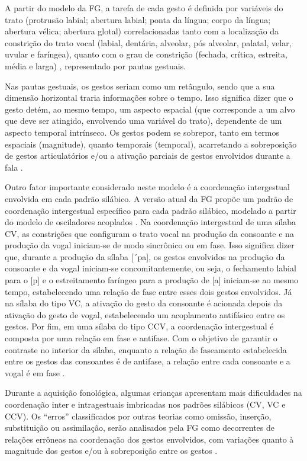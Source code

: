 \documentclass[output=paper,colorlinks,citecolor=brown,booklanguage=portuguese]{langscibook}
\begin{document}
A partir do modelo da FG, a tarefa de cada gesto é definida por variáveis do trato (protrusão labial; abertura labial; ponta da língua; corpo da língua; abertura vélica; abertura glotal) correlacionadas tanto com a localização da constrição do trato vocal (labial, dentária, alveolar, pós alveolar, palatal, velar, uvular e faríngea), quanto com o grau de constrição (fechada, crítica, estreita, média e larga) \citep{Browman1992, Albano2001}, representado por pautas gestuais. 

Nas pautas gestuais, os gestos seriam como um retângulo, sendo que a sua dimensão horizontal traria informações sobre o tempo. Isso significa dizer que o gesto detém, ao mesmo tempo, um aspecto espacial (que corresponde a um alvo que deve ser atingido, envolvendo uma variável do trato), dependente de um aspecto temporal intrínseco. Os gestos podem se sobrepor, tanto em termos espaciais (magnitude), quanto temporais (temporal), acarretando a sobreposição de gestos articulatórios e/ou a ativação parciais de gestos envolvidos durante a fala \citep{Pouplier2005}.

Outro fator importante considerado neste modelo é a coordenação intergestual envolvida em cada padrão silábico. A versão atual da FG propõe um padrão de coordenação intergestual específico para cada padrão silábico, modelado a partir do modelo de osciladores acoplados \citep{Goldstein2007}. Na coordenação intergestual de uma sílaba CV, as constrições que configuram o trato vocal na produção da consoante e na produção da vogal iniciam-se de modo sincrônico ou em fase. Isso significa dizer que, durante a produção da sílaba [´pa], os gestos envolvidos na produção da consoante e da vogal iniciam-se concomitantemente, ou seja, o fechamento labial para o [p] e o estreitamento faríngeo para a produção de [a] iniciam-se ao mesmo tempo, estabelecendo uma relação de fase entre esses dois gestos envolvidos. Já na sílaba do tipo VC, a ativação do gesto da consoante é acionada depois da ativação do gesto de vogal, estabelecendo um acoplamento antifásico entre os gestos. Por fim, em uma sílaba do tipo CCV, a coordenação intergestual é composta por uma relação em fase e antifase.  Com o objetivo de garantir o contraste no interior da sílaba, enquanto a relação de faseamento estabelecida entre os gestos das consoantes é de antifase, a relação entre cada consoante e a vogal é em fase \citep{Browman2000, Marin2010}. 

Durante a aquisição fonológica, algumas crianças apresentam mais dificuldades na coordenação inter e intragestuais imbricadas nos padrões silábicos (CV, VC e CCV). Os “erros” classificados por outras teorias como omissão, inserção, substituição ou assimilação, serão analisados pela FG como decorrentes de relações errôneas na coordenação dos gestos envolvidos, com variações quanto à magnitude dos gestos e/ou à sobreposição entre os gestos \citep{Pouplier2005}.
\end{document}
